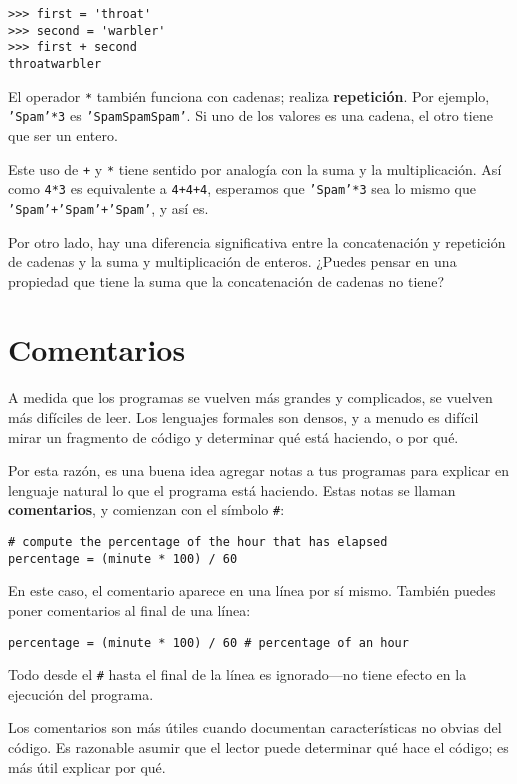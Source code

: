 \documentclass[12pt,letterpaper]{book}
\begin{document}
\begin{lstlisting}
>>> first = 'throat'
>>> second = 'warbler'
>>> first + second
throatwarbler
\end{lstlisting}

El operador \texttt{*} también funciona con cadenas; realiza \textbf{repetición}. 
Por ejemplo, \texttt{'Spam'*3} es \texttt{'SpamSpamSpam'}. Si uno de los valores es una cadena, el otro tiene que ser un entero.

Este uso de \texttt{+} y \texttt{*} tiene sentido por analogía con la suma y la multiplicación. 
Así como \texttt{4*3} es equivalente a \texttt{4+4+4}, esperamos que \texttt{'Spam'*3} sea lo mismo que \texttt{'Spam'+'Spam'+'Spam'}, y así es.

Por otro lado, hay una diferencia significativa entre la concatenación y repetición de cadenas y la suma y multiplicación de enteros. ¿Puedes pensar en una propiedad que tiene la suma que la concatenación de cadenas no tiene?

\section{Comentarios}

A medida que los programas se vuelven más grandes y complicados, se vuelven más difíciles de leer. Los lenguajes formales son densos, y a menudo es difícil mirar un fragmento de código y determinar qué está haciendo, o por qué.

Por esta razón, es una buena idea agregar notas a tus programas para explicar en lenguaje natural lo que el programa está haciendo. Estas notas se llaman \textbf{comentarios}, y comienzan con el símbolo \texttt{\#}:

\begin{lstlisting}
# compute the percentage of the hour that has elapsed
percentage = (minute * 100) / 60
\end{lstlisting}

En este caso, el comentario aparece en una línea por sí mismo. También puedes poner comentarios al final de una línea:

\begin{lstlisting}
percentage = (minute * 100) / 60 # percentage of an hour
\end{lstlisting}

Todo desde el \texttt{\#} hasta el final de la línea es ignorado—no tiene efecto en la ejecución del programa.

Los comentarios son más útiles cuando documentan características no obvias del código. Es razonable asumir que el lector puede determinar qué hace el código; es más útil explicar por qué.
\end{document}
